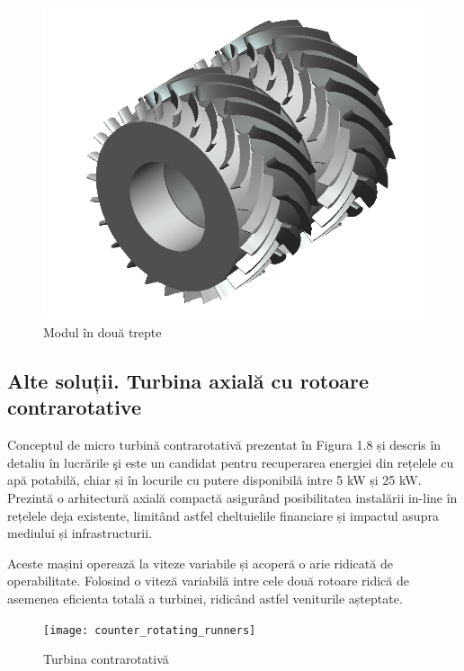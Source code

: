 \begin{figure}[h!]
	\centering
	\includegraphics[scale=0.6]{figures/modul_in_doua_trepte.png}
	\caption{Modul în două trepte \cite{susanhub}}
	\label{Modul în două trepte}
\end{figure}



\subsection{Alte soluții. Turbina axială cu rotoare contrarotative}

Conceptul de micro turbină contrarotativă prezentat în Figura 1.8 și descris în detaliu în lucrările \cite{andolfatto2016simulation} \c{s}i \cite{andolfatto2015mixed} este un candidat pentru recuperarea energiei din rețelele cu apă potabilă, chiar și în locurile cu putere disponibilă intre 5 kW și 25 kW. Prezintă o arhitectură axială compactă asigurând posibilitatea instalării in-line în rețelele deja existente, limitând astfel cheltuielile financiare și impactul asupra mediului și infrastructurii.

Aceste mașini operează la viteze variabile și acoperă o arie ridicată de operabilitate. Folosind o viteză variabilă intre cele două rotoare ridică de asemenea eficienta totală a turbinei, ridicând astfel veniturile așteptate.

\begin{figure}[h!]
	\centering
	\texttt{[image: counter\_rotating\_runners]}
	\caption{Turbina contrarotativă \cite{andolfatto2016simulation}}
	\label{Turbina contrarotativă}
\end{figure}

